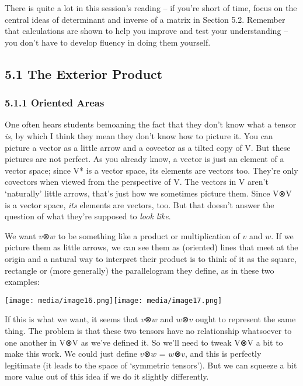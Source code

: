 \documentclass[oneside,english]{amsbook}
\numberwithin{section}{chapter}
\theoremstyle{plain}
\theoremstyle{definition}
\begin{document}
There is quite a lot in this session's reading -- if you're short of
time, focus on the central ideas of determinant and inverse of a matrix
in Section 5.2. Remember that calculations are shown to help you improve
and test your understanding -- you don't have to develop fluency in
doing them yourself.

\subsection{5.1 The Exterior Product}\label{the-exterior-product}

\subsubsection{5.1.1 Oriented Areas}\label{oriented-areas}

One often hears students bemoaning the fact that they don't know what a
tensor \emph{is}, by which I think they mean they don't know how to
picture it. You can picture a vector as a little arrow and a covector as
a tilted copy of V. But these pictures are not perfect. As you already
know, a vector is just an element of a vector space; since V* is a
vector space, its elements are vectors too. They're only covectors when
viewed from the perspective of V. The vectors in V aren't `naturally'
little arrows, that's just how we sometimes picture them. Since V⊗V is a
vector space, \emph{its} elements are vectors, too. But that doesn't
answer the question of what they're supposed to \emph{look like}.

We want $v$⊗$w$ to be something like a product or multiplication
of $v$ and $w$. If we picture them as little arrows, we can see
them as (oriented) lines that meet at the origin and a natural way to
interpret their product is to think of it as the square, rectangle or
(more generally) the parallelogram they define, as in these two
examples:

\texttt{[image: media/image16.png]}\texttt{[image: media/image17.png]}

If this is what we want, it seems that $v$⊗$w$ and $w$⊗$v$
ought to represent the same thing. The problem is that these two tensors
have no relationship whatsoever to one another in V⊗V as we've defined
it. So we'll need to tweak V⊗V a bit to make this work. We could just
define $v$⊗$w$ = $w$⊗$v$, and this is perfectly legitimate
(it leads to the space of `symmetric tensors'). But we can squeeze a
bit more value out of this idea if we do it slightly differently.
\end{document}

